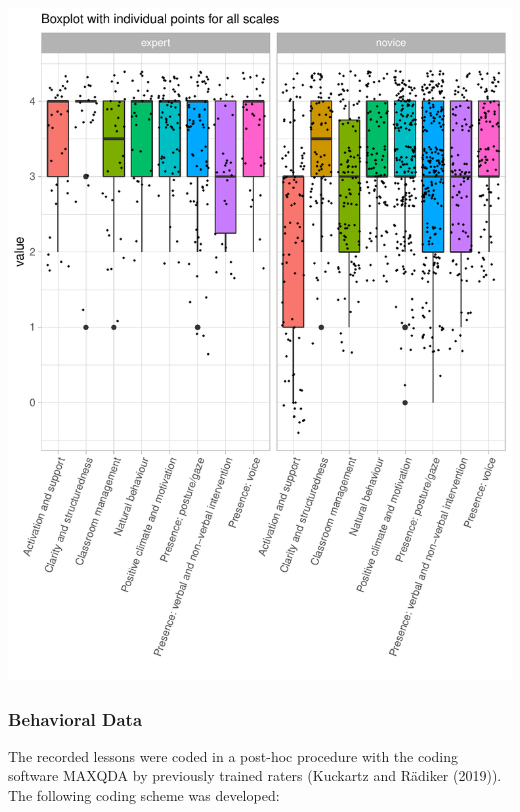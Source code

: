 \documentclass[
  english,
  man,floatsintext]{apa6}
\begin{document}
\includegraphics{paper_1_supplement_files/figure-latex/boxplot scales-1.pdf}

\newpage

\hypertarget{behavioral-data-1}{%
\subsubsection{Behavioral Data}\label{behavioral-data-1}}

The recorded lessons were coded in a post-hoc procedure with the coding software MAXQDA by previously trained raters (Kuckartz and Rädiker (2019)). The following coding scheme was developed:
\end{document}
